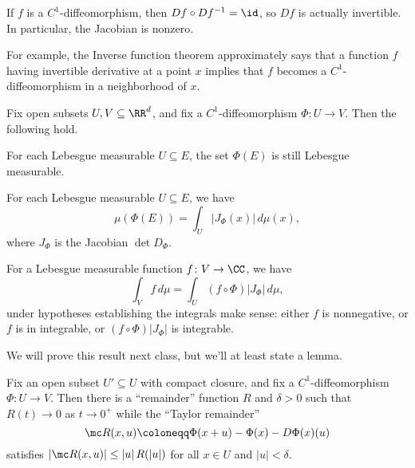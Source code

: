 \documentclass[../notes.tex]{subfiles}
\begin{document}
\begin{remark}
	If $f$ is a $C^1$-diffeomorphism, then $Df\circ Df^{-1}=\id$, so $Df$ is actually invertible. In particular, the Jacobian is nonzero.
\end{remark}
\begin{remark}
	For example, the Inverse function theorem approximately says that a function $f$ having invertible derivative at a point $x$ implies that $f$ becomes a $C^1$-diffeomorphism in a neighborhood of $x$.
\end{remark}
\begin{theorem}
	Fix open subsets $U,V\subseteq\RR^d$, and fix a $C^1$-diffeomorphism $\Phi\colon U\to V$. Then the following hold.
	\begin{listalph}
		\item For each Lebesgue measurable $U\subseteq E$, the set $\Phi(E)$ is still Lebesgue measurable.
		\item For each Lebesgue measurable $U\subseteq E$, we have
		\[\mu(\Phi(E))=\int_U\left|J_\Phi(x)\right|\,d\mu(x),\]
		where $J_\Phi$ is the Jacobian $\det D_\Phi$.
		\item For a Lebesgue measurable function $f\colon V\to\CC$, we have
		\[\int_Vf\,d\mu=\int_U(f\circ\Phi)\left|J_\Phi\right|\,d\mu,\]
		under hypotheses establishing the integrals make sense: either $f$ is nonnegative, or $f$ is in integrable, or $(f\circ\Phi)\left|J_\Phi\right|$ is integrable.
	\end{listalph}
\end{theorem}
We will prove this result next class, but we'll at least state a lemma.
\begin{lemma}
	Fix an open subset $U'\subseteq U$ with compact closure, and fix a $C^1$-diffeomorphism $\Phi\colon U\to V$. Then there is a ``remainder'' function $R$ and $\delta>0$ such that $R(t)\to0$ as $t\to0^+$ while the ``Taylor remainder''
	\[\mc R(x,u)\coloneqq\Phi(x+u)-\Phi(x)-D\Phi(x)(u)\]
	satisfies $\left|\mc R(x,u)\right|\le\left|u\right|R(\left|u\right|)$ for all $x\in U$ and $\left|u\right|<\delta$.
\end{lemma}
\end{document}
